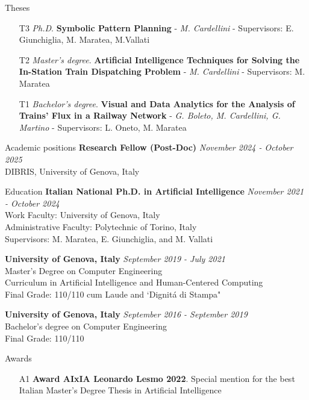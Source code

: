 \documentclass{resume} %
\begin{document}
\begin{rSection}{Theses}

\begin{enumerate}[leftmargin=5mm]
\item[T3] \textit{Ph.D}. \textbf{Symbolic Pattern Planning} - \textit{M. Cardellini} - Supervisors: E. Giunchiglia, M. Maratea, M.Vallati
\item[T2] \textit{Master's degree}. \textbf{Artificial Intelligence Techniques for Solving the In-Station
Train Dispatching Problem} - \textit{M. Cardellini} - Supervisors: M. Maratea
\item[T1] \textit{Bachelor's degree}. \textbf{Visual and Data Analytics for the Analysis of Trains' Flux in a Railway Network} - \textit{G. Boleto, M. Cardellini, G. Martino} - Supervisors: L. Oneto, M. Maratea
\end{enumerate}
\end{rSection}


\pagebreak
\begin{rSection}{Academic positions}
{\bf  Research Fellow (Post-Doc)} \hfill {\em November 2024 - \textit{October 2025}} \\ 
DIBRIS, University of Genova, Italy
\end{rSection}


\begin{rSection}{Education}
{\bf  Italian National Ph.D. in Artificial Intelligence} \hfill {\em November 2021 - \textit{October 2024}} \\ 
Work Faculty: University of Genova, Italy\\
Administrative Faculty: Polytechnic of Torino, Italy\\
Supervisors: M. Maratea, E. Giunchiglia, and M. Vallati

{\bf University of Genova, Italy} \hfill {\em September 2019 - July 2021} \\ 
Master's Degree on Computer Engineering \\
Curriculum in Artificial Intelligence and Human-Centered Computing \\
Final Grade: 110/110 cum Laude and `Dignit\'a di Stampa" 

{\bf University of Genova, Italy} \hfill {\em September 2016 - September 2019} \\ 
Bachelor's degree on Computer Engineering \\
Final Grade: 110/110 
\end{rSection}
\begin{rSection}{Awards}
\begin{enumerate}[leftmargin=5mm]
	\item[A1] \textbf{Award AIxIA Leonardo Lesmo 2022}. Special mention for the best Italian Master's Degree Thesis in Artificial Intelligence
\end{enumerate}
\end{rSection}
\end{document}
